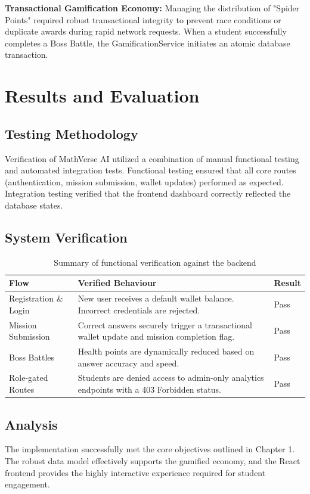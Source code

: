 \documentclass[12pt,a4paper]{report}
\begin{document}
\textbf{Transactional Gamification Economy:}
Managing the distribution of "Spider Points" required robust transactional integrity to prevent race conditions or duplicate awards during rapid network requests. When a student successfully completes a Boss Battle, the GamificationService initiates an atomic database transaction.

\chapter{Results and Evaluation}

\section{Testing Methodology}
Verification of MathVerse AI utilized a combination of manual functional testing and automated integration tests. Functional testing ensured that all core routes (authentication, mission submission, wallet updates) performed as expected. Integration testing verified that the frontend dashboard correctly reflected the database states.

\section{System Verification}

\begin{table}[h]
\centering
\begin{tabular}{@{}p{3.5cm}p{8.5cm}l@{}}
\toprule
\textbf{Flow} & \textbf{Verified Behaviour} & \textbf{Result} \\ \midrule
Registration \& Login & New user receives a default wallet balance. Incorrect credentials are rejected. & Pass \\ 
Mission Submission & Correct answers securely trigger a transactional wallet update and mission completion flag. & Pass \\ 
Boss Battles & Health points are dynamically reduced based on answer accuracy and speed. & Pass \\ 
Role-gated Routes & Students are denied access to admin-only analytics endpoints with a 403 Forbidden status. & Pass \\ \bottomrule
\end{tabular}
\caption{Summary of functional verification against the backend}
\end{table}

\section{Analysis}
The implementation successfully met the core objectives outlined in Chapter 1. The robust data model effectively supports the gamified economy, and the React frontend provides the highly interactive experience required for student engagement. 
\end{document}
